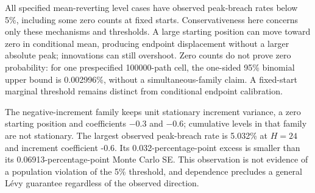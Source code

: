 \documentclass[11pt,a4paper]{article}
\begin{document}
\endgroup
All specified mean-reverting level cases have observed peak-breach rates below 5\%, including some zero counts at fixed starts. Conservativeness here concerns only these mechanisms and thresholds. A large starting position can move toward zero in conditional mean, producing endpoint displacement without a larger absolute peak; innovations can still overshoot. Zero counts do not prove zero probability: for one prespecified 100000-path cell, the one-sided 95\% binomial upper bound is 0.002996\%, without a simultaneous-family claim. A fixed-start marginal threshold remains distinct from conditional endpoint calibration.

The negative-increment family keeps unit stationary increment variance, a zero starting position and coefficients \(-\)0.3 and \(-\)0.6; cumulative levels in that family are not stationary. The largest observed peak-breach rate is 5.032\% at \(H=24\) and increment coefficient -0.6. Its 0.032-percentage-point excess is smaller than its 0.06913-percentage-point Monte Carlo SE. This observation is not evidence of a population violation of the 5\% threshold, and dependence precludes a general Lévy guarantee regardless of the observed direction.
\end{document}
